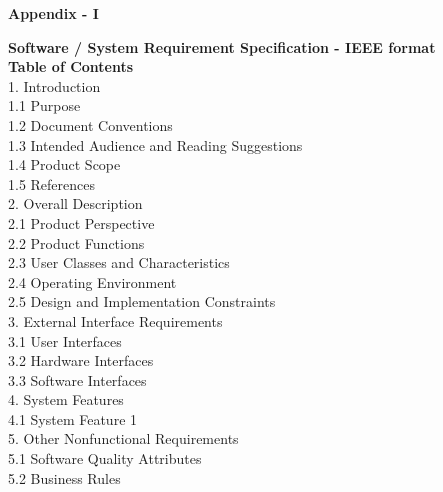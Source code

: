 	\begin{center}
	\thispagestyle{empty}
	\vspace{2cm}
	\LARGE{\textbf{Appendix - I}}\\[1.0cm]
	\end{center}
	
	\textbf{Software / System Requirement Specification - IEEE format}\\
	\textbf{Table of Contents}\\
	1.\hspace{0.3cm}	Introduction\\
	1.1\hspace{0.3cm} Purpose\\
	1.2 \hspace{0.3cm} Document Conventions\\
	1.3 \hspace{0.3cm} Intended Audience and Reading Suggestions\\
	1.4 \hspace{0.3cm} Product Scope\\
	1.5 \hspace{0.3cm} References\\
	2.\hspace{0.3cm}	Overall Description\\
	2.1	\hspace{0.3cm}Product Perspective\\
	2.2\hspace{0.3cm}	Product Functions\\
	2.3	\hspace{0.3cm}User Classes and Characteristics\\
	2.4	\hspace{0.3cm}Operating Environment\\
	2.5\hspace{0.3cm}	Design and Implementation Constraints\\
	3.	\hspace{0.3cm}External Interface Requirements\\
	3.1	\hspace{0.3cm}User Interfaces\\
	3.2	\hspace{0.3cm}Hardware Interfaces\\
	3.3	\hspace{0.3cm}Software Interfaces\\
	4.\hspace{0.3cm}	System Features\\
	4.1	\hspace{0.3cm}System Feature 1\\
	5.\hspace{0.3cm}	Other Nonfunctional Requirements\\
	5.1	\hspace{0.3cm}Software Quality Attributes\\
	5.2	\hspace{0.3cm}Business Rules\\
	
